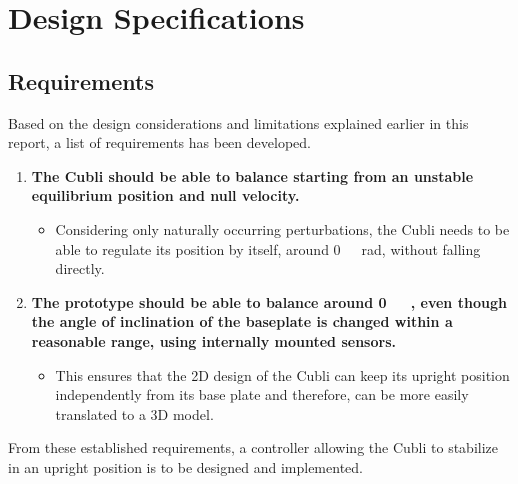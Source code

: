 \chapter{Design Specifications}\label{chap:specifications}


\section{Requirements}\label{sec:requirements}
Based on the design considerations and limitations explained earlier in this report, a list of requirements has been developed. %
%
\begin{enumerate}
\item \textbf{The Cubli should be able to balance starting from an unstable equilibrium position and null velocity.}
  \begin{itemize}
  \item[] Considering only naturally occurring perturbations, the Cubli needs to be able to regulate its position by itself, around \si{0\ rad}, without falling directly.
  \end{itemize}

\item \textbf{The prototype should be able to balance around \si{0\ \rad}, even though the angle of inclination of the baseplate is changed within a reasonable range, using internally mounted sensors.}  
  \begin{itemize}
  \item[] This ensures that the 2D design of the Cubli can keep its upright position independently from its base plate and therefore, can be more easily translated to a 3D model.
  \end{itemize}
%  
%  	
\end{enumerate}
%
From these established requirements, a controller allowing the Cubli to stabilize in an upright position is to be designed and implemented.

